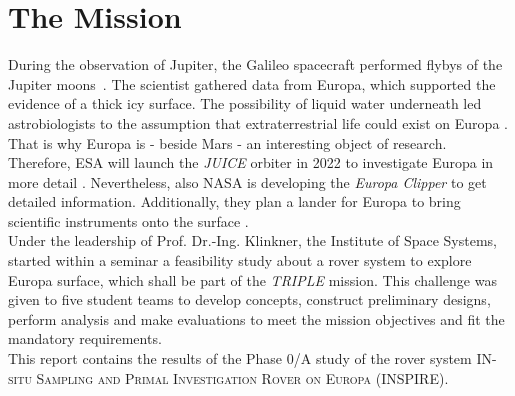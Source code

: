 %
%
%
\chapter{The Mission}
\label{chap:mission}

During the observation  of Jupiter, the Galileo spacecraft performed flybys of the Jupiter moons~\cite{Mission_01}.
The scientist gathered data from Europa, which supported the evidence of a thick icy surface.
The possibility of liquid water underneath led astrobiologists to the assumption that extraterrestrial life could exist on Europa \cite{Mission_02}.
That is why Europa is - beside Mars - an interesting object of research.\\

Therefore, ESA will launch the \textit{JUICE} orbiter in 2022 to investigate Europa in more detail \cite{Mission_03}. 
Nevertheless, also NASA is developing the  \textit{Europa Clipper} to get detailed information.
Additionally, they plan a lander for Europa to bring scientific instruments onto the surface \cite{Mission_04, Mission_05}.\\

Under the leadership of  Prof. Dr.-Ing. Klinkner, the Institute of Space Systems, started within a seminar a feasibility study about a rover system to explore Europa surface, which shall  be part of the \textit{TRIPLE} mission.
This challenge was given to five student teams to develop concepts, construct preliminary designs, perform analysis and make evaluations to  meet the mission objectives and fit the mandatory requirements. \\


This report contains the results of the Phase 0/A study of the rover system \textsc{IN-situ Sampling and Primal Investigation Rover on Europa}  (INSPIRE).